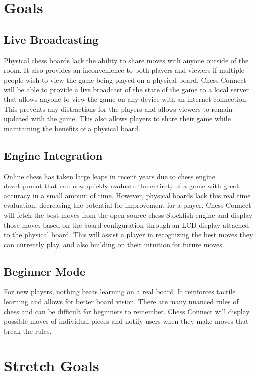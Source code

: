 \documentclass{article}
\begin{document}
\section{Goals}
\subsection{Live Broadcasting}
{Physical chess boards lack the ability to share moves with anyone outside of the room. It also provides an inconvenience to both players and viewers if multiple people wish to view the game being played on a physical board. 
Chess Connect will be able to provide a live broadcast of the state of the game to a local server that allows anyone to view the game on any device with an internet connection. 
This prevents any distractions for the players and allows viewers to remain updated with the game. This also allows players to share their game while maintaining the benefits of a physical board.} 

\subsection{Engine Integration}
{Online chess has taken large leaps in recent years due to chess engine development that can now quickly evaluate the entirety of a game with great accuracy in a small amount of time. 
However, physical boards lack this real time evaluation, decreasing the potential for improvement for a player. Chess Connect will fetch the best moves from the open-source chess Stockfish engine and display those moves based on the board configuration through an LCD display attached to the physical board. 
This will assist a player in recognizing the best moves they can currently play, and also building on their intuition for future moves.}

\subsection{Beginner Mode}
{For new players, nothing beats learning on a real board. It reinforces tactile learning and allows for better board vision. There are many nuanced rules of chess and can be difficult for beginners to remember. 
Chess Connect will display possible moves of individual pieces and notify users when they make moves that break the rules.}

\section{Stretch Goals}
\end{document}
